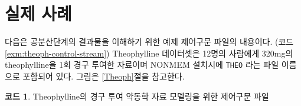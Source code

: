 \documentclass[
  11pt,
  krantz2,
  a4paper]{krantz}
\theoremstyle{definition}
\theoremstyle{definition}
\newtheorem{example}{코드}[chapter]
\theoremstyle{definition}
\theoremstyle{remark}
\begin{document}
\hypertarget{actual-example}{%
\section{실제 사례}\label{actual-example}}

다음은 공분산단계의 결과물을 이해하기 위한 예제 제어구문 파일의 내용이다. (코드 \ref{exm:theoph-control-stream}) Theophylline 데이터셋은 12명의 사람에게 320mg의 theophylline을 1회 경구 투여한 자료이며 NONMEM 설치시에 \texttt{THEO} 라는 파일 이름으로 포함되어 있다. 그림은 \ref{Theoph}절을 참고한다.

\begin{example}
\protect\hypertarget{exm:theoph-control-stream}{}{\label{exm:theoph-control-stream} }Theophylline의 경구 투여 약동학 자료 모델링을 위한 제어구문 파일
\end{example}
\end{document}
